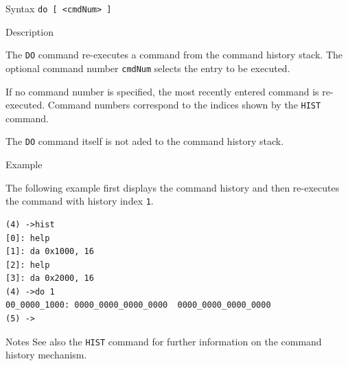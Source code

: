 %
%
\pagebreak
{}

\begin{iPageDescEntry}{Syntax}
\texttt{do [ <cmdNum> ]}
\end{iPageDescEntry}

\begin{iPageDescEntry}{Description}

The \texttt{DO} command re-executes a command from the command history stack.
The optional command number \texttt{cmdNum} selects the entry to be executed.

If no command number is specified, the most recently entered command is
re-executed. Command numbers correspond to the indices shown by the
\texttt{HIST} command.

The \texttt{DO} command itself is not aded to the command history stack.

\end{iPageDescEntry}

\begin{iPageDescEntry}{Example}

The following example first displays the command history and then re-executes
the command with history index \texttt{1}.

\begin{lstlisting}[style=iPageOpStyle]
(4) ->hist
[0]: help
[1]: da 0x1000, 16
[2]: help
[3]: da 0x2000, 16
(4) ->do 1
00_0000_1000: 0000_0000_0000_0000  0000_0000_0000_0000
(5) ->
\end{lstlisting}
\end{iPageDescEntry}

\begin{iPageDescEntry}{Notes}
See also the \texttt{HIST} command for further information on the command
history mechanism.
\end{iPageDescEntry}
